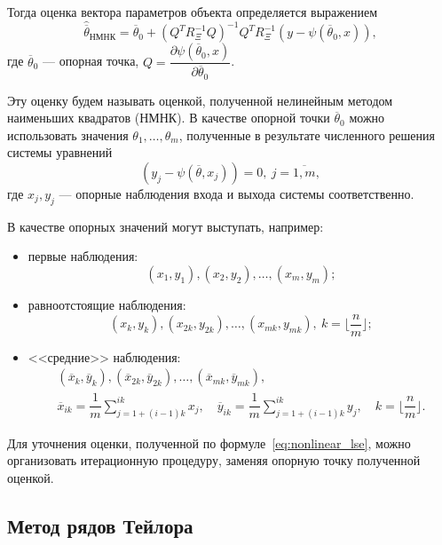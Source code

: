Тогда оценка вектора параметров объекта определяется выражением~\cite{mukha_2009}
\begin{equation}
  \label{eq:nonlinear_lse}
  \hat{\overline{\theta}}_{\text{НМНК}} =
  \overline{\theta}_0 + (Q^T R^{-1}_{\Xi} Q)^{-1} Q^T R^{-1}_{\Xi} (y - \psi(\overline{\theta}_0, x)),
\end{equation}
где \( \overline{\theta}_0 \) --- опорная точка,
\( Q = \dfrac{\partial \psi(\overline{\theta}_0, x) }{ \partial \overline{\theta}_0 } \).

Эту оценку будем называть оценкой, полученной нелинейным
методом наименьших квадратов (НМНК).
В качестве опорной точки \( \overline{\theta}_0 \) можно использовать значения
\( \theta_1, \dotsc, \theta_m \),
полученные в результате численного решения системы уравнений
\begin{equation}
  \label{eq:nonlinear_basic}
  (y_j - \psi( \overline{\theta}, x_j )) = 0, \: j = \overline{1,m},
\end{equation}
где \( x_j, y_j \) --- опорные наблюдения входа и выхода системы соответственно.

В качестве опорных значений могут выступать, например:
\begin{itemize}
\item первые наблюдения:
  \[ (x_1, y_1), (x_2, y_2), \dotsc , (x_m, y_m); \]
\item равноотстоящие наблюдения:
  \[
    (x_{k}, y_{k}), (x_{2k}, y_{2k}) , \dotsc , (x_{mk}, y_{mk}), \:
    k = \lfloor \dfrac{n}{m} \rfloor;
  \]
\item <<средние>> наблюдения:
  \begin{gather*}
    ( \overline{x}_{k}, \overline{y}_{k} ),
    ( \overline{x}_{2k}, \overline{y}_{2k} ),
    \dotsc ,
    ( \overline{x}_{mk}, \overline{y}_{mk}), \\
    \overline{x}_{ik} = \dfrac{1}{m} \sum_{j = 1+(i-1)k}^{ik} x_j, \quad
    \overline{y}_{ik} = \dfrac{1}{m} \sum_{j = 1+(i-1)k}^{ik} y_j, \quad
    k = \lfloor \dfrac{n}{m} \rfloor.
  \end{gather*}
\end{itemize}

Для уточнения оценки, полученной по формуле~\eqref{eq:nonlinear_lse}, можно
организовать итерационную процедуру, заменяя опорную точку полученной оценкой.

\vspace{2\baselineskip}
\subsection{Метод рядов Тейлора}

